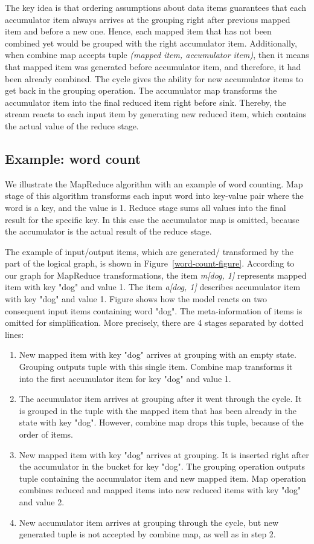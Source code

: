 The key idea is that ordering assumptions about data items guarantees that each accumulator item always arrives at the grouping right after previous mapped item and before a new one. Hence, each mapped item that has not been combined yet would be grouped with the right accumulator item. Additionally, when combine map accepts tuple {\it (mapped item, accumulator item)}, then it means that mapped item was generated before accumulator item, and therefore, it had been already combined. The cycle gives the ability for new accumulator items to get back in the grouping operation. The accumulator map transforms the accumulator item into the final reduced item right before sink. Thereby, the stream reacts to each input item by generating new reduced item, which contains the actual value of the reduce stage.

\subsection{Example: word count}

We illustrate the MapReduce algorithm with an example of word counting. Map stage of this algorithm transforms each input word into key-value pair where the word is a key, and the value is 1. Reduce stage sums all values into the final result for the specific key. In this case the accumulator map is omitted, because the accumulator is the actual result of the reduce stage.

The example of input/output items, which are generated/ transformed by the part of the logical graph, is shown in Figure~\ref {word-count-figure}. According to our graph for MapReduce transformations, the item {\it m[dog, 1]} represents mapped item with key "dog" and value 1. The item {\it a[dog, 1]} describes accumulator item with key "dog" and value 1. Figure shows how the model reacts on two consequent input items containing word "dog". The meta-information of items is omitted for simplification. More precisely, there are 4 stages separated by dotted lines:

\begin{enumerate}
    \item New mapped item with key "dog" arrives at grouping with an empty state. Grouping outputs tuple with this single item. Combine map transforms it into the first accumulator item for key "dog" and value 1.
    \item The accumulator item arrives at grouping after it went through the cycle. It is grouped in the tuple with the mapped item that has been already in the state with key "dog". However, combine map drops this tuple, because of the order of items.
    \item New mapped item with key "dog" arrives at grouping. It is inserted right after the accumulator in the bucket for key "dog". The grouping operation outputs tuple containing the accumulator item and new mapped item. Map operation combines reduced and mapped items into new reduced items with key "dog" and value 2.
    \item New accumulator item arrives at grouping through the cycle, but new generated tuple is not accepted by combine map, as well as in step 2.
\end{enumerate}

